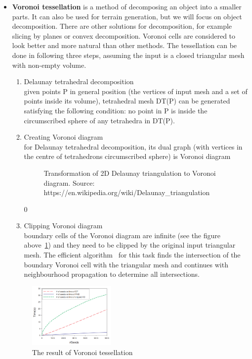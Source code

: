 \begin{itemize}
\item \textbf{Voronoi tessellation} is a method of decomposing an object into a smaller parts. It can also be used for terrain generation, but we will focus on object decomposition. There are other solutions for decomposition, for example slicing by planes or convex decomposition. Voronoi cells are considered to look better and more natural than other methods. The tessellation can be done in following three steps, assuming the input is a closed triangular mesh with non-empty volume.
\begin{enumerate}
    \item Delaunay tetrahedral decomposition \\ given points P in general position (the vertices of input mesh and a set of points inside its volume), tetrahedral mesh DT(P) can be generated satisfying the following condition: no point in P is inside the circumscribed sphere of any tetrahedra in DT(P).
    \item Creating Voronoi diagram \\ for Delaunay tetrahedral decomposition, its dual graph (with vertices in the centre of tetrahedrons circumscribed sphere) is Voronoi diagram
    \begin{figure}[ht!]
        \centering
        \caption{Transformation of 2D Delaunay triangulation to Voronoi diagram. Source: https://en.wikipedia.org/wiki/Delaunay\_triangulation}
        \label{DT}
    \end{figure}0
    \item Clipping Voronoi diagram \\ boundary cells of the Voronoi diagram are infinite (see the figure above~\ref{DT}) and they need to be clipped by the original input triangular mesh. The efficient algorithm~\cite{yan2010efficient} for this task finds the intersection of the boundary Voronoi cell with the triangular mesh and continues with neighbourhood propagation to determine all intersections. 
\end{enumerate}

\begin{figure}[ht!]
        \centering
        \includegraphics[width=0.4\textwidth]{img/clipped}
        \caption{The result of Voronoi tessellation \cite{yan2010efficient}}
        \label{voro}
\end{figure}
\end{itemize}


